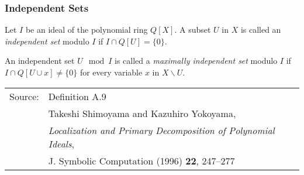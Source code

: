 \documentclass[11pt]{beamer}
\begin{document}
\begin{frame}[t]
\frametitle{Independent Sets}
\begin{definition}
Let $I$ be an ideal of the polynomial ring $Q[X]$. A subset $U$ in $X$ is called an {\it independent
set} modulo $I$ if $I \cap Q[U] = \{0\}$.

\end{definition}

\begin{definition}
An independent set $U \mod I$ is called a {\it maximally
independent set} modulo $I$ if $I \cap Q[U \cup {x}] \ne \{0\}$ for every variable $x$ in $X \backslash U$.
\end{definition}

\vfill

\begin{tabular}{ll}
Source: & Definition A.9 \\
        & Takeshi Shimoyama and Kazuhiro Yokoyama, \\
        & {\it Localization and Primary Decomposition of Polynomial Ideals}, \\
        & J. Symbolic Computation (1996) {\bf 22}, 247–277 \\
\end{tabular}
\end{frame}
\end{document}
